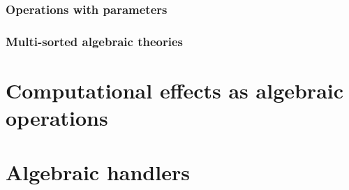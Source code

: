 \documentclass{amsart}
\begin{document}
\subsubsection{Operations with parameters}
\label{sec:oper-with-param}



\subsubsection{Multi-sorted algebraic theories}
\label{sec:multi-sort-algebr}


\section{Computational effects as algebraic operations}
\label{sec:comp-effects-as}

\section{Algebraic handlers}
\label{sec:algebraic-handlers}
\end{document}
